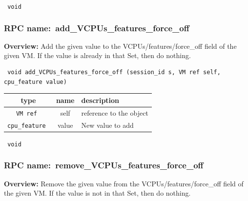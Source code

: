 \vspace{0.3cm}

{\tt 
void
}



\vspace{0.3cm}
\vspace{0.3cm}
\vspace{0.3cm}
\subsubsection{RPC name:~add\_VCPUs\_features\_force\_off}

{\bf Overview:} 
Add the given value to the VCPUs/features/force\_off field of the given VM.  If the value is already in that Set, then do nothing.

\begin{verbatim} void add_VCPUs_features_force_off (session_id s, VM ref self, cpu_feature value)\end{verbatim}



 
\vspace{0.3cm}
\begin{tabular}{|c|c|p{7cm}|}
 \hline
{\bf type} & {\bf name} & {\bf description} \\ \hline
{\tt VM ref } & self & reference to the object \\ \hline 

{\tt cpu\_feature } & value & New value to add \\ \hline 

\end{tabular}

\vspace{0.3cm}

{\tt 
void
}



\vspace{0.3cm}
\vspace{0.3cm}
\vspace{0.3cm}
\subsubsection{RPC name:~remove\_VCPUs\_features\_force\_off}

{\bf Overview:} 
Remove the given value from the VCPUs/features/force\_off field of the given VM.  If the value is not in that Set, then do nothing.


